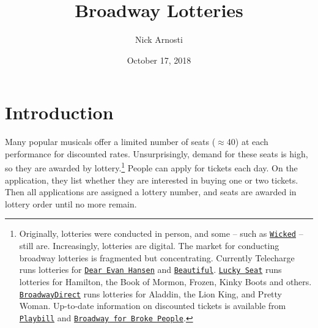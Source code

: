 \documentclass[11pt, oneside]{article}   	%
\title{Broadway Lotteries}
\author{Nick Arnosti}
\date{October 17, 2018}							%
\newcommand{\link}[2]{{ \color{blue} \tt{\href{#1}{#2}}}}
\begin{document}
\maketitle

\onehalfspacing


\section{Introduction}
Many popular musicals offer a limited number of seats ($\approx$40) at each performance for discounted rates. Unsurprisingly, demand for these seats is high, so they are awarded by lottery.\footnote{Originally, lotteries were conducted in person, and some -- such as \link{https://wickedthemusical.com/faq/}{Wicked} -- still are. Increasingly, lotteries are digital. The market for conducting broadway lotteries is fragmented but concentrating. Currently Telecharge runs lotteries for \link{https://dearevanhansenlottery.com/}{Dear Evan Hansen} and  \link{https://beautifullottery.com/}{Beautiful}. \link{https://www.luckyseat.com/lottery.php}{Lucky Seat} runs lotteries for Hamilton, the Book of Mormon, Frozen, Kinky Boots and others. \link{https://lottery.broadwaydirect.com/\#_ga=2.69017361.1856233165.1539802119-1525586824.1539802119} {BroadwayDirect} runs lotteries for Aladdin, the Lion King, and Pretty Woman. Up-to-date information on discounted tickets is available from  \link{http://www.playbill.com/article/broadway-rush-lottery-and-standing-room-only-policies-com-116003}{Playbill} and  \link{http://broadwayforbrokepeople.com/}{Broadway for Broke People}.} People can apply for tickets each day. On the application, they list whether they are interested in buying one or two tickets. Then all applications are assigned a lottery number, and seats are awarded in lottery order until no more remain. 

\end{document}
